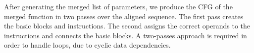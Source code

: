 
After generating the merged list of parameters, we produce the CFG of the merged function in two
passes over the aligned sequence.
The first pass creates the basic blocks and instructions.
The second assigns the correct operands to the instructions and connects the basic blocks.
A two-passes approach is required in order to handle loops, due to cyclic data dependencies.

%
%
%
%


